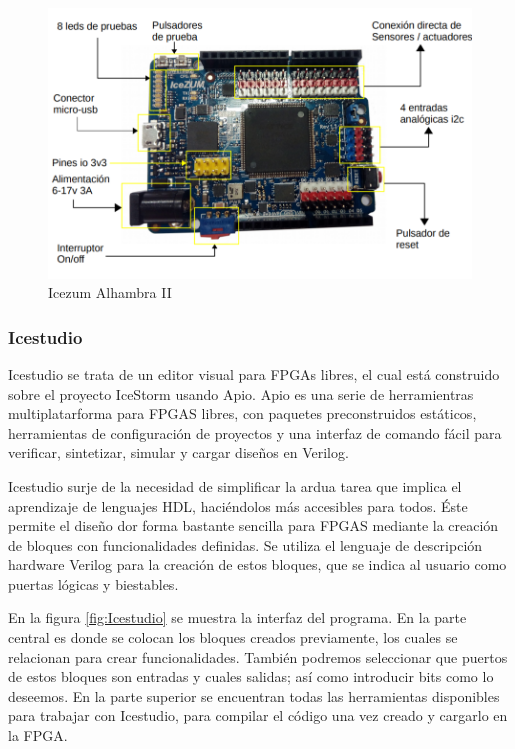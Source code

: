 \begin{figure}[H]
	\center
	\includegraphics[scale=0.6]{imagenes/Herramientas/Icezum2.png}
	\caption{Icezum Alhambra II}
	\label{fig:Icezum Alhambra II}
\end{figure}

\newpage
\subsubsection{Icestudio}

Icestudio se trata de un editor visual para FPGAs libres, el cual está construido sobre el proyecto IceStorm usando Apio. Apio es una serie de herramientras multiplatarforma para FPGAS libres, con paquetes preconstruidos estáticos, herramientas de configuración de proyectos y una interfaz de comando fácil para verificar, sintetizar, simular y cargar diseños en Verilog. \newline

Icestudio surje de la necesidad de simplificar la ardua tarea que implica el aprendizaje de lenguajes HDL, haciéndolos más accesibles para todos.  Éste permite el diseño dor forma bastante sencilla para FPGAS mediante la creación de bloques con funcionalidades definidas. Se utiliza el lenguaje de descripción hardware Verilog para la creación de estos bloques, que se indica al usuario como puertas lógicas y biestables.  \newline

En la figura \ref{fig:Icestudio} se muestra la interfaz del programa. En la parte central es donde se colocan los bloques creados previamente, los cuales se relacionan para crear funcionalidades. También podremos seleccionar que puertos de estos bloques son entradas y cuales salidas; así como introducir bits como lo deseemos. En la parte superior se encuentran todas las herramientas disponibles para trabajar con Icestudio, para compilar el código una vez creado y cargarlo en la FPGA.

